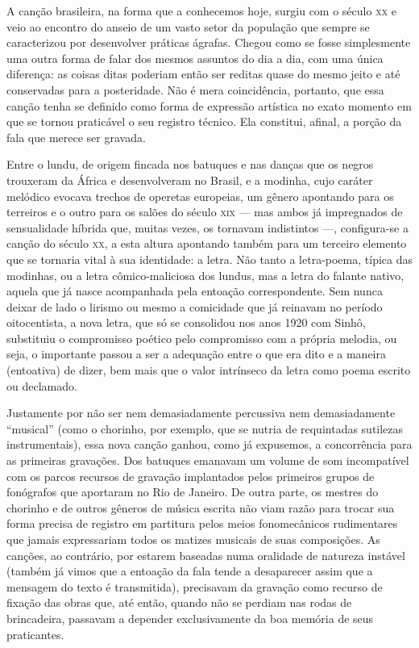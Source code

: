 A canção brasileira, na forma que a conhecemos hoje, surgiu com o século
\textsc{xx} e veio ao encontro do anseio de um vasto setor da população que
sempre se caracterizou por desenvolver práticas ágrafas. Chegou como se
fosse simplesmente uma outra forma de falar dos mesmos assuntos do dia a
dia, com uma única diferença: as coisas ditas poderiam então ser reditas
quase do mesmo jeito e até conservadas para a posteridade. Não é mera
coincidência, portanto, que essa canção tenha se definido como forma de
expressão artística no exato momento em que se tornou praticável o seu
registro técnico. Ela constitui, afinal, a porção da fala que merece ser
gravada.

Entre o lundu, de origem fincada nos batuques e nas danças que os negros
trouxeram da África e desenvolveram no Brasil, e a modinha, cujo caráter
melódico evocava trechos de operetas europeias, um gênero apontando para
os terreiros e o outro para os salões do século \textsc{xix} --- mas ambos já
impregnados de sensualidade híbrida que, muitas vezes, os tornavam
indistintos ---, configura-se a canção do século \textsc{xx}, a esta altura
apontando também para um terceiro elemento que se tornaria vital à sua
identidade: a letra. Não tanto a letra-poema, típica das modinhas, ou a
letra cômico-maliciosa dos lundus, mas a letra do falante nativo, aquela
que já nasce acompanhada pela entoação correspondente. Sem nunca deixar
de lado o lirismo ou mesmo a comicidade que já reinavam no período
oitocentista, a nova letra, que só se consolidou nos anos 1920 com
Sinhô, substituiu o compromisso poético pelo compromisso com a própria
melodia, ou seja, o importante passou a ser a adequação entre o que era
dito e a maneira (entoativa) de dizer, bem mais que o valor intrínseco
da letra como poema escrito ou declamado.

Justamente por não ser nem demasiadamente percussiva nem demasiadamente
``musical'' (como o chorinho, por exemplo, que se nutria de requintadas
sutilezas instrumentais), essa nova canção ganhou, como já expusemos, a
concorrência para as primeiras gravações. Dos batuques emanavam um
volume de som incompatível com os parcos recursos de gravação
implantados pelos primeiros grupos de fonógrafos que aportaram no Rio de
Janeiro. De outra parte, os mestres do chorinho e de outros gêneros de
música escrita não viam razão para trocar sua forma precisa de registro
em partitura pelos meios fonomecânicos rudimentares que jamais
expressariam todos os matizes musicais de suas composições. As canções,
ao contrário, por estarem baseadas numa oralidade de natureza instável
(também já vimos que a entoação da fala tende a desaparecer assim que a
mensagem do texto é transmitida), precisavam da gravação como recurso de
fixação das obras que, até então, quando não se perdiam nas rodas de
brincadeira, passavam a depender exclusivamente da boa memória de seus
praticantes.

